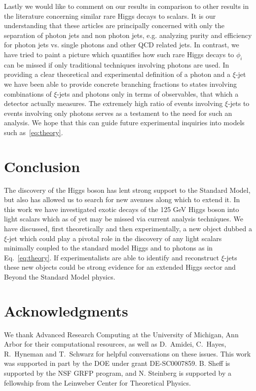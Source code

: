 \documentclass[letter,12pt]{article}
\begin{document}
Lastly we would like to comment on our results in comparison to other results in the literature concerning similar rare Higgs decays to scalars. It is our understanding that these articles are principally concerned with only the separation of photon jets and non photon jets, e.g. analyzing purity and efficiency for photon jets vs. single photons and other QCD related jets. In contrast, we have tried to paint a picture which quantifies how such rare Higgs decays to $\phi_{i}$ can be missed if only traditional techniques involving photons are used. In providing a clear theoretical and experimental definition of a photon and a $\xi$-jet we have been able to provide concrete branching fractions to states involving combinations of $\xi$-jets and photons only in terms of observables, that which a detector actually measures. The extremely high ratio of events involving $\xi$-jets to events involving only photons serves as a testament to the need for such an analysis. We hope that this can guide future experimental inquiries into models such as~\ref{eq:theory}.

\section{Conclusion}

The discovery of the Higgs boson has lent strong support to the Standard Model, but also has allowed us to search for new avenues along which to extend it. In this work we have investigated exotic decays of the 125 GeV Higgs boson into light scalars which as of yet may be missed via current analysis techniques. We have discussed, first theoretically and then experimentally, a new object dubbed a $\xi$-jet which could play a pivotal role in the discovery of any light scalars minimally coupled to the standard model Higgs and to photons as in Eq.~\ref{eq:theory}. If experimentalists are able to identify and reconstruct $\xi$-jets these new objects could be strong evidence for an extended Higgs sector and Beyond the Standard Model physics. 

\section{Acknowledgments}  
We thank Advanced Research Computing at the University of Michigan, Ann Arbor for their computational resources, as well as D.~Amidei, C.~Hayes, R.~Hyneman and T.~Schwarz for helpful conversations on these issues. This work was supported in part by the DOE under grant DE-SC0007859. B. Sheff is supported by the NSF GRFP program, and N. Steinberg is supported by a fellowship from the Leinweber Center for Theoretical Physics.  




\end{document}
